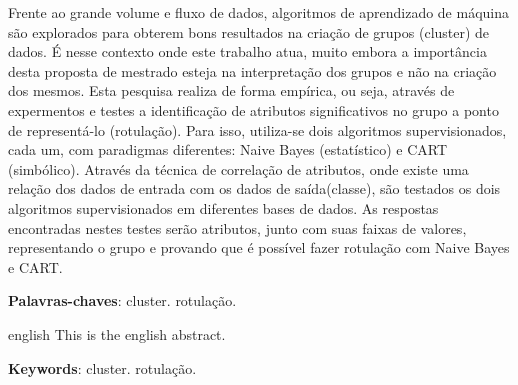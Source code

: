 
\setlength{\absparsep}{18pt} %
\begin{resumo}
Frente ao grande volume e fluxo de dados, algoritmos de aprendizado de máquina são explorados para obterem bons resultados na criação de grupos (cluster) de dados. É nesse contexto onde este trabalho atua, muito embora a importância desta proposta de mestrado esteja na interpretação dos grupos e não na criação dos mesmos. Esta pesquisa realiza de forma empírica, ou seja, através de expermentos e testes a identificação de atributos significativos no grupo a ponto de representá-lo (rotulação). Para isso, utiliza-se dois algoritmos supervisionados, cada um, com paradigmas diferentes: Naive Bayes (estatístico) e CART (simbólico). Através da técnica de correlação de atributos, onde existe uma relação dos dados de entrada com os dados de saída(classe), são testados os dois algoritmos supervisionados em diferentes bases de dados. As respostas encontradas nestes testes serão atributos, junto com suas faixas de valores, representando o grupo e provando que é possível fazer rotulação com Naive Bayes e CART.


  \textbf{Palavras-chaves}: cluster. rotulação.
\end{resumo}

\begin{resumo}[Abstract]
 \begin{otherlanguage*}{english}
   This is the english abstract.

   \vspace{\onelineskip}
 
   \noindent 
   \textbf{Keywords}:  cluster. rotulação.
 \end{otherlanguage*}
\end{resumo}
